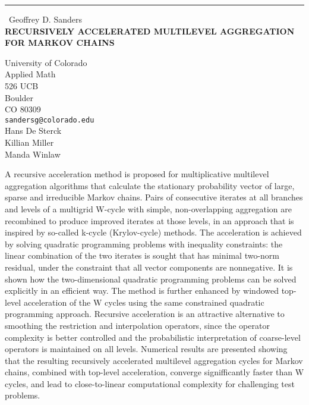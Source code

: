 \documentclass{report}
\begin{document}
\begin{center}
\rule{6in}{1pt} \
{\large Geoffrey D. Sanders \\
{\bf RECURSIVELY ACCELERATED MULTILEVEL AGGREGATION FOR MARKOV CHAINS}}

University of Colorado \\ Applied Math \\ 526 UCB \\ Boulder \\ CO 80309
\\
{\tt sandersg@colorado.edu}\\
Hans De Sterck\\
Killian Miller \\
Manda Winlaw\end{center}

A recursive acceleration method is proposed for multiplicative multilevel aggregation
algorithms that calculate the stationary probability vector of large,
sparse and irreducible Markov chains. Pairs of consecutive iterates at
all branches and levels of a multigrid W-cycle with simple,
non-overlapping aggregation are recombined to produce improved iterates
at those levels, in an approach that is inspired by so-called k-cycle
(Krylov-cycle) methods. The acceleration is achieved by solving quadratic
programming problems with inequality constraints: the linear combination
of the two iterates is sought that has minimal two-norm residual, under
the constraint that all vector components are nonnegative. It is shown
how the two-dimensional quadratic programming problems can be solved
explicitly in an efficient way. The method is further enhanced by
windowed top-level acceleration of the W cycles using the same
constrained quadratic programming approach. Recursive acceleration is an
attractive alternative to smoothing the restriction and interpolation
operators, since the operator complexity is better controlled and the
probabilistic interpretation of coarse-level operators is maintained on
all levels. Numerical results are presented showing that the resulting
recursively accelerated multilevel aggregation cycles for Markov chains,
combined with top-level acceleration, converge signifficantly faster
than W cycles, and lead to close-to-linear computational complexity for
challenging test problems.
\end{document}
